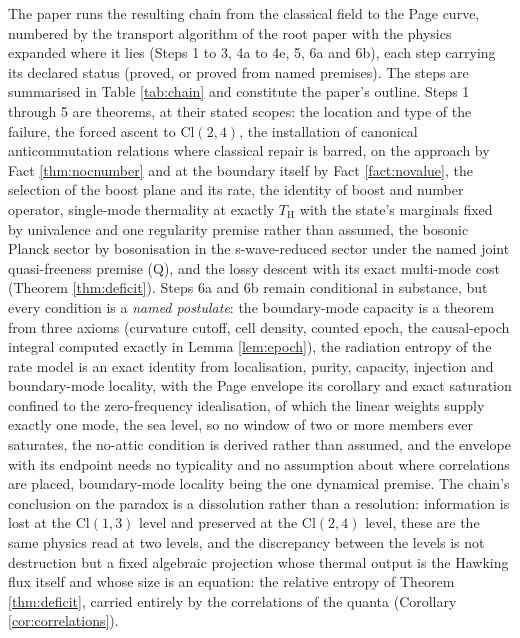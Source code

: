 \documentclass[11pt]{article}
\theoremstyle{definition}
\newcommand{\Cl}{\mathrm{Cl}}
\renewcommand{\TH}{T_{\mathrm{H}}} %
\begin{document}
The paper runs the resulting chain from the classical field to the Page curve, numbered by the transport algorithm of the root paper with the physics expanded where it lies (Steps 1 to 3, 4a to 4e, 5, 6a and 6b), each step carrying its declared status (proved, or proved from named premises). The steps are summarised in Table \ref{tab:chain} and constitute the paper's outline. Steps 1 through 5 are theorems, at their stated scopes: the location and type of the failure, the forced ascent to $\Cl(2,4)$, the installation of canonical anticommutation relations where classical repair is barred, on the approach by Fact \ref{thm:nocnumber} and at the boundary itself by Fact \ref{fact:novalue}, the selection of the boost plane and its rate, the identity of boost and number operator, single-mode thermality at exactly $\TH$ with the state's marginals fixed by univalence and one regularity premise rather than assumed, the bosonic Planck sector by bosonisation in the s-wave-reduced sector under the named joint quasi-freeness premise (Q), and the lossy descent with its exact multi-mode cost (Theorem \ref{thm:deficit}). Steps 6a and 6b remain conditional in substance, but every condition is a \emph{named postulate}: the boundary-mode capacity is a theorem from three axioms (curvature cutoff, cell density, counted epoch, the causal-epoch integral computed exactly in Lemma \ref{lem:epoch}), the radiation entropy of the rate model is an exact identity from localisation, purity, capacity, injection and boundary-mode locality, with the Page envelope its corollary and exact saturation confined to the zero-frequency idealisation, of which the linear weights supply exactly one mode, the sea level, so no window of two or more members ever saturates, the no-attic condition is derived rather than assumed, and the envelope with its endpoint needs no typicality and no assumption about where correlations are placed, boundary-mode locality being the one dynamical premise. The chain's conclusion on the paradox is a dissolution rather than a resolution: information is lost at the $\Cl(1,3)$ level and preserved at the $\Cl(2,4)$ level, these are the same physics read at two levels, and the discrepancy between the levels is not destruction but a fixed algebraic projection whose thermal output is the Hawking flux itself and whose size is an equation: the relative entropy of Theorem \ref{thm:deficit}, carried entirely by the correlations of the quanta (Corollary \ref{cor:correlations}).
\end{document}
